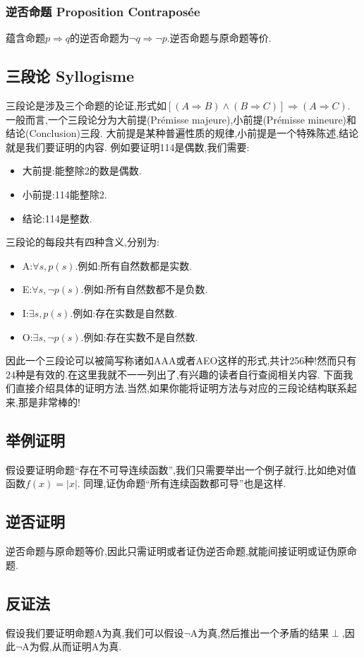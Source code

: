 \documentclass[12pt, a4paper, oneside]{ctexbook}
\begin{document}
  \subsubsection{逆否命题 Proposition Contraposée}
  蕴含命题$p\Rightarrow q$的逆否命题为$\lnot q\Rightarrow \lnot p$.逆否命题与原命题等价.
  

  \subsection{三段论 Syllogisme}
  三段论是涉及三个命题的论证,形式如$[(A\Rightarrow B)\land (B\Rightarrow C)]\Rightarrow (A\Rightarrow C)$.
  一般而言,一个三段论分为大前提(Prémisse majeure),小前提(Prémisse mineure)和结论(Conclusion)三段.
  大前提是某种普遍性质的规律,小前提是一个特殊陈述,结论就是我们要证明的内容.
  例如要证明114是偶数,我们需要:\begin{itemize}
    \item 大前提:能整除2的数是偶数.
    \item 小前提:114能整除2.
    \item 结论:114是整数.
  \end{itemize}
  三段论的每段共有四种含义,分别为:
  \begin{itemize}
    \item A:$\forall s,p(s)$.例如:所有自然数都是实数.
    \item E:$\forall s,\lnot p(s)$.例如:所有自然数都不是负数.
    \item I:$\exists s,p(s)$.例如:存在实数是自然数.
    \item O:$\exists s,\lnot p(s)$.例如:存在实数不是自然数.
  \end{itemize}
  因此一个三段论可以被简写称诸如AAA或者AEO这样的形式,共计256种!然而只有24种是有效的.在这里我就不一一列出了,有兴趣的读者自行查阅相关内容.
  下面我们直接介绍具体的证明方法.当然,如果你能将证明方法与对应的三段论结构联系起来,那是非常棒的!

  \subsection{举例证明}
  假设要证明命题“存在不可导连续函数”,我们只需要举出一个例子就行,比如绝对值函数$f(x)=|x|$.
  同理,证伪命题“所有连续函数都可导”也是这样.
  \subsection{逆否证明}
  逆否命题与原命题等价,因此只需证明或者证伪逆否命题,就能间接证明或证伪原命题.
  \subsection{反证法}
  假设我们要证明命题A为真,我们可以假设$\lnot $A为真,然后推出一个矛盾的结果$\perp $,因此$\lnot $A为假,从而证明A为真.\\
  
\end{document}
